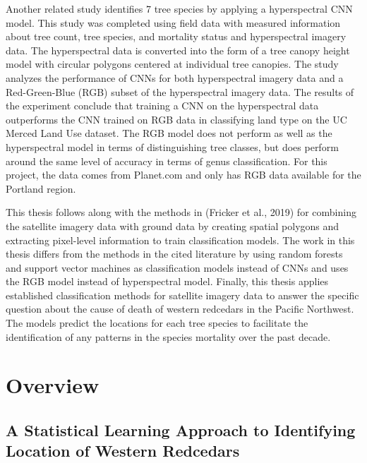 \documentclass[12pt,twoside]{reedthesis}
\begin{document}
Another related study identifies 7 tree species by applying a hyperspectral CNN model. This study was completed using field data with measured information about tree count, tree species, and mortality status and hyperspectral imagery data. The hyperspectral data is converted into the form of a tree canopy height model with circular polygons centered at individual tree canopies. The study analyzes the performance of CNNs for both hyperspectral imagery data and a Red-Green-Blue (RGB) subset of the hyperspectral imagery data. The results of the experiment conclude that training a CNN on the hyperspectral data outperforms the CNN trained on RGB data in classifying land type on the UC Merced Land Use dataset. The RGB model does not perform as well as the hyperspectral model in terms of distinguishing tree classes, but does perform around the same level of accuracy in terms of genus classification. For this project, the data comes from Planet.com and only has RGB data available for the Portland region.

This thesis follows along with the methods in (Fricker et al., 2019) for combining the satellite imagery data with ground data by creating spatial polygons and extracting pixel-level information to train classification models. The work in this thesis differs from the methods in the cited literature by using random forests and support vector machines as classification models instead of CNNs and uses the RGB model instead of hyperspectral model. Finally, this thesis applies established classification methods for satellite imagery data to answer the specific question about the cause of death of western redcedars in the Pacific Northwest. The models predict the locations for each tree species to facilitate the identification of any patterns in the species mortality over the past decade.

\hypertarget{overview}{%
\section{Overview}\label{overview}}

\hypertarget{a-statistical-learning-approach-to-identifying-location-of-western-redcedars}{%
\subsection{A Statistical Learning Approach to Identifying Location of Western Redcedars}\label{a-statistical-learning-approach-to-identifying-location-of-western-redcedars}}
\end{document}
